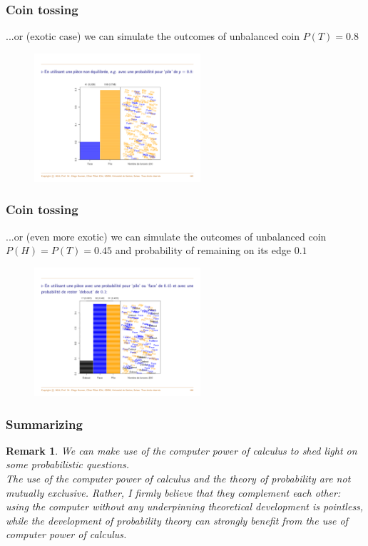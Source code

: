 \documentclass[notes=show,smaller,handout]{beamer}\usepackage[]{graphicx}\usepackage[]{color}
\newtheorem{remark}{Remark}[section]
\begin{document}
\begin{frame}
  \frametitle{Coin tossing}

  ...or (exotic case) we can simulate the outcomes of unbalanced coin $P(T)=0.8$

  \begin{center} %
  \begin{figure}[ptb]\centering
  \includegraphics[width=0.55\textwidth,height=0.6\textheight]{img/sim7.pdf}
  \end{figure}
  \end{center}
\end{frame}


\begin{frame}
  \frametitle{Coin tossing}

  ...or (even more exotic) we can simulate the outcomes of unbalanced coin $P(H)=P(T)=0.45$ and probability of remaining
   on its edge $0.1$


  \begin{center} %
  \begin{figure}[ptb]\centering
  \includegraphics[width=0.55\textwidth,height=0.6\textheight]{img/sim8.pdf}
  \end{figure}
  \end{center}

\end{frame}


\begin{frame}
  \frametitle{Summarizing}

  \begin{remark}
  We can make use of the computer power of calculus to shed light on some probabilistic questions.\\ The use of the computer power of calculus and the theory of probability are not mutually exclusive. Rather, I firmly believe that they complement each other: using the computer without any underpinning theoretical development is pointless, while the development of probability theory can strongly benefit from the use of computer power of calculus.
  \end{remark}
\end{frame}
\end{document}
